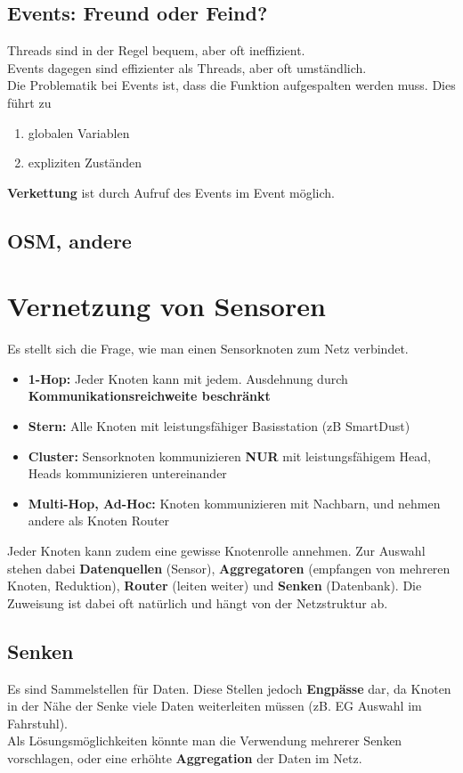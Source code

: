\documentclass[a4paper]{article}
\begin{document}
\subsection{Events: Freund oder Feind?}
Threads sind in der Regel bequem, aber oft ineffizient.\\
Events dagegen sind effizienter als Threads, aber oft umständlich.\\

Die Problematik bei Events ist, dass die Funktion aufgespalten werden muss. Dies führt zu
\begin{enumerate}
	\item globalen Variablen
	\item expliziten Zuständen
\end{enumerate}
\textbf{Verkettung} ist durch Aufruf des Events im Event möglich.
\subsection{OSM, andere}
\newpage
\section{Vernetzung von Sensoren}
Es stellt sich die Frage, wie man einen Sensorknoten zum Netz verbindet.
\begin{itemize}
	\item \textbf{1-Hop:} Jeder Knoten kann mit jedem. Ausdehnung durch \textbf{Kommunikationsreichweite beschränkt}
	\item \textbf{Stern:} Alle Knoten mit leistungsfähiger Basisstation (zB SmartDust)
	\item \textbf{Cluster:} Sensorknoten kommunizieren \textbf{NUR} mit leistungsfähigem Head, Heads kommunizieren untereinander
	\item \textbf{Multi-Hop, Ad-Hoc:} Knoten kommunizieren mit Nachbarn, und nehmen andere als Knoten Router
\end{itemize}
Jeder Knoten kann zudem eine gewisse Knotenrolle annehmen. Zur Auswahl stehen dabei \textbf{Datenquellen} (Sensor), \textbf{Aggregatoren} (empfangen von mehreren Knoten, Reduktion), \textbf{Router} (leiten weiter) und \textbf{Senken} (Datenbank). Die Zuweisung ist dabei oft natürlich und hängt von der Netzstruktur ab.
\subsection{Senken}
Es sind Sammelstellen für Daten. Diese Stellen jedoch \textbf{Engpässe} dar, da Knoten in der Nähe der Senke viele Daten weiterleiten müssen (zB. EG Auswahl im Fahrstuhl).\\
Als Lösungsmöglichkeiten könnte man die Verwendung mehrerer Senken vorschlagen, oder eine erhöhte \textbf{Aggregation} der Daten im Netz.
\end{document}
